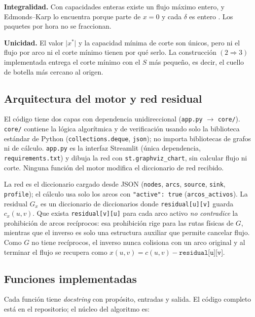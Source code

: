 \documentclass[12pt, a4paper]{article}
\begin{document}
\textbf{Integralidad.} Con capacidades enteras existe un flujo máximo entero, y Edmonds--Karp lo encuentra porque parte de $x=0$ y cada $\delta$ es entero \cite{ford1956, ahuja1993}. Los paquetes por hora no se fraccionan.

\textbf{Unicidad.} El valor $\lvert x^*\rvert$ y la capacidad mínima de corte son únicos, pero ni el flujo por arco ni el corte mínimo tienen por qué serlo. La construcción $(2\Rightarrow 3)$ implementada entrega el corte mínimo con el $S$ más pequeño, es decir, el cuello de botella más cercano al origen.

\subsection{Arquitectura del motor y red residual}

El código tiene dos capas con dependencia unidireccional (\texttt{app.py} $\to$ \texttt{core/}). \texttt{core/} contiene la lógica algorítmica y de verificación usando solo la biblioteca estándar de Python (\texttt{collections.deque}, \texttt{json}); no importa bibliotecas de grafos ni de cálculo. \texttt{app.py} es la interfaz Streamlit (única dependencia, \texttt{requirements.txt}) y dibuja la red con \texttt{st.graphviz\_chart}, sin calcular flujo ni corte. Ninguna función del motor modifica el diccionario de red recibido.

La red es el diccionario cargado desde JSON (\texttt{nodes}, \texttt{arcs}, \texttt{source}, \texttt{sink}, \texttt{profile}); el cálculo usa solo los arcos con \texttt{"active": true} (\texttt{arcos\_activos}). La residual $G_x$ es un diccionario de diccionarios donde \texttt{residual[u][v]} guarda $c_x(u,v)$. Que exista \texttt{residual[v][u]} para cada arco activo \emph{no contradice} la prohibición de arcos recíprocos: esa prohibición rige para las rutas físicas de $G$, mientras que el inverso es solo una estructura auxiliar que permite cancelar flujo. Como $G$ no tiene recíprocos, el inverso nunca colisiona con un arco original y al terminar el flujo se recupera como $x(u,v) = c(u,v) - \texttt{residual[u][v]}$.

\subsection{Funciones implementadas}

Cada función tiene \emph{docstring} con propósito, entradas y salida. El código completo está en el repositorio; el núcleo del algoritmo es:
\end{document}
